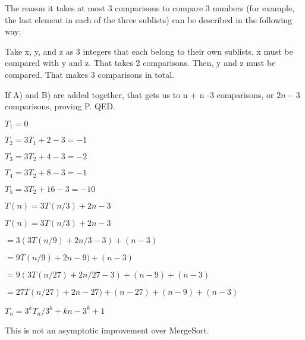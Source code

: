 \documentclass{6042}
\begin{document}
The reason it takes at most 3 comparisons to compare 3 numbers (for example, the last element in each of the three sublists) can be described in the following way:

Take x, y, and z as 3 integers that each belong to their own sublists. x must be compared with y and z. That takes 2 comparisons. Then, y and z must be compared. That makes 3 comparisons in total.

If A) and B) are added together, that gets us to n + n -3 comparisons, or $2n -3$ comparisons, proving P. QED.



$T_1 = 0$

$T_2 = 3T_1 + 2 - 3 = -1$

$T_3 = 3T_2 + 4 - 3 = -2$

$T_4 = 3T_2 + 8 - 3 = -1$

$T_5 = 3T_2 + 16 - 3 = -10$

$T(n) = 3T(n/3) + 2n -3$

$T(n) = 3T(n/3) + 2n -3$

$ = 3(3T(n/9) + 2n/3 - 3) + (n - 3)$

$ = 9T(n/9) + 2n - 9) + (n - 3)$

$ = 9(3T(n/27) + 2n/27 - 3) + (n-9) + (n - 3)$

$ = 27T(n/27) + 2n - 27) + (n - 27) + (n - 9) + (n - 3)$

$T_n = 3^kT_n/{3^k} + kn - 3^k + 1$

This is not an asymptotic improvement over MergeSort.
\end{document}
